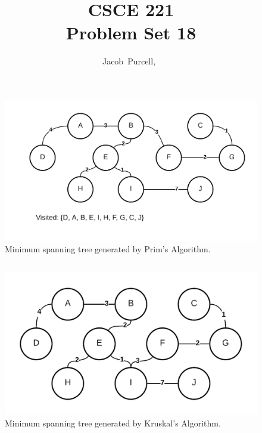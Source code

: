 \documentclass[journal]{IEEEtran}
\begin{document}
\title{CSCE 221 \\ Problem Set 18}

\author{Jacob~Purcell,~}

\maketitle
\section{}
\subsection{}
\begin{figure}[h!]
    \includegraphics[scale = 0.17]{pa.png}
    \caption{Minimum spanning tree generated by Prim's Algorithm.}
\end{figure}

\subsection{}
\begin{figure}[h!]
    \includegraphics[scale = 0.17]{ka.png}
    \caption{Minimum spanning tree generated by Kruskal's Algorithm.}
\end{figure}
\end{document}
